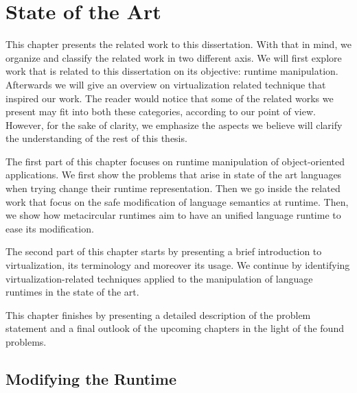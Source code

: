
\chapter{State of the Art}
\minitoc
\introduction

This chapter presents the related work to this dissertation. With that in mind, we organize and classify the related work in two different axis. We will first explore work that is related to this dissertation on its objective: runtime manipulation. Afterwards we will give an overview on virtualization related technique that inspired our work. The reader would notice that some of the related works we present may fit into both these categories, according to our point of view. However, for the sake of clarity, we emphasize the aspects we believe will clarify the understanding of the rest of this thesis.

The first part of this chapter focuses on runtime manipulation of object-oriented applications. We first show the problems that arise in state of the art languages when trying change their runtime representation. Then we go inside the related work that focus on the safe modification of language semantics at runtime. Then, we show how metacircular runtimes aim to have an unified language runtime to ease its modification. 

The second part of this chapter starts by presenting a brief introduction to virtualization, its terminology and moreover its usage. We continue by identifying virtualization-related techniques applied to the manipulation of language runtimes in the state of the art.   

This chapter finishes by presenting a detailed description of the problem statement and a final outlook of the upcoming chapters in the light of the found problems.


\newpage

\section{Modifying the Runtime}

